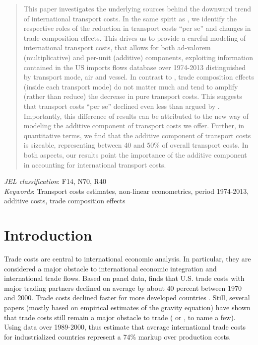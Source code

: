 \documentclass[a4paper,11pt]{article}
\begin{document}
\begin{abstract}
This paper investigates the underlying sources behind the downward trend of international transport costs. In the same spirit as \cite{hummels2007}, we identify the respective roles of the reduction in transport costs ``per se'' and changes in trade composition effects. This drives us to provide a careful modeling of international transport costs, that allows for both ad-valorem (multiplicative) and per-unit (additive) components, exploiting information contained in the US imports flows database over 1974-2013 distinguished by transport mode, air and vessel. In contrast to \cite{hummels2007}, trade composition effects (inside each transport mode) do not matter much and tend to amplify (rather than reduce) the decrease in pure transport costs. This suggests that transport costs ``per se'' declined even less than argued by \cite{hummels2007}. Importantly, this difference of results can be attributed to the new way of modeling the additive component of transport costs we offer. Further, in quantitative terms, we find that the additive component of transport costs is sizeable, representing between 40 and 50\% of overall transport costs. In both aspects, our results point the importance of the additive component in accounting for international transport costs.
\end{abstract}


\thispagestyle{empty} \pagestyle{plain} \setcounter{page}{1}

\bigskip


\noindent \emph{JEL classification}: F14, N70, R40 \\
\noindent \emph{Keywords}: Transport costs estimates, non-linear econometrics, period 1974-2013, additive costs, trade composition effects

{\normalsize \vspace{0cm} }

{\normalsize \titlepage }

{\normalsize \newpage }


\section{Introduction \label{sec:Intro}}

Trade costs are central to international economic analysis. In particular, they are considered a major obstacle to international economic integration and international trade flows. Based on panel data, \citet{novy13} finds  that U.S. trade costs with major trading partners declined on average by about 40 percent between 1970 and 2000. Trade costs declined faster for more developed countries \cite{arvis2016trade}. Still, several papers (mostly based on empirical estimates of the gravity equation) have shown that trade costs still remain a major obstacle to trade (\citealp{Head_Mayer04} or \citealp{Disdier_Head08}, to name a few). Using data over 1989-2000, \citet{anderson_wincoop_jel} thus estimate that average international trade costs for industrialized countries represent a 74\% markup over production costs.
\end{document}
